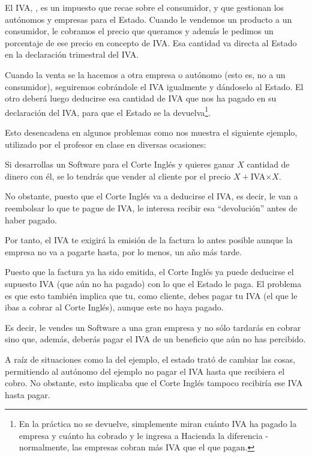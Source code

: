 \documentclass[nochap,palatino,shortheader]{apuntes}
\begin{document}
El IVA, , es un impuesto que recae sobre el consumidor, y que gestionan los autónomos y empresas para el Estado. Cuando le vendemos un producto a un consumidor, le cobramos el precio que queramos y además le pedimos un porcentaje de ese precio en concepto de IVA. Esa cantidad va directa al Estado en la declaración trimestral del IVA.

Cuando la venta se la hacemos a otra empresa o autónomo (esto es, no a un consumidor), seguiremos cobrándole el IVA igualmente y dándoselo al Estado. El otro deberá luego deducirse esa cantidad de IVA que nos ha pagado en su declaración del IVA, para que el Estado se la devuelva\footnote{En la práctica no se devuelve, simplemente miran cuánto IVA ha pagado la empresa y cuánto ha cobrado y le ingresa a Hacienda la diferencia - normalmente, las empresas cobran más IVA que el que pagan.}.

Esto desencadena en algunos problemas como nos muestra el siguiente ejemplo, utilizado por el profesor en clase en diversas ocasiones:
\begin{example}
Si desarrollas un Software para el Corte Inglés y quieres ganar $X$ cantidad de dinero con él, se lo tendrás que vender al cliente por el precio $X+$IVA$\times X$.

No obstante, puesto que el Corte Inglés va a deducirse el IVA, es decir, le van a reembolsar lo que te pague de IVA, le interesa recibir esa ``devolución'' antes de haber pagado.

Por tanto, el IVA te exigirá la emisión de la factura lo antes posible aunque la empresa no va a pagarte hasta, por lo menos, un año más tarde.

Puesto que la factura ya ha sido emitida, el Corte Inglés ya puede deducirse el supuesto IVA (que aún no ha pagado) con lo que el Estado le paga. El problema es que esto también implica que tu, como cliente, debes pagar tu IVA (el que le ibas a cobrar al Corte Inglés), aunque este no haya pagado.

Es decir, le vendes un Software a una gran empresa y no sólo tardarás en cobrar sino que, además, deberás pagar el IVA de un beneficio que aún no has percibido.
\end{example}

A raíz de situaciones como la del ejemplo, el estado trató de cambiar las cosas, permitiendo al autónomo del ejemplo no pagar el IVA hasta que recibiera el cobro. No obstante, esto implicaba que el Corte Inglés tampoco recibiría ese IVA hasta pagar.
\end{document}
